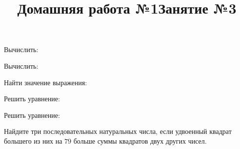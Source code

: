 \newpage
\title{Домашняя работа №1}
\begin{listofex}
	\item Вычислить:
	\begin{enumcols}[itemcolumns=1]
		\item {}
		\item {}
		\item {}
		\item {}
		\item {}
	\end{enumcols}
	\item Вычислить:
	\begin{enumcols}[itemcolumns=2]
		\item {}
		\item {}
		\item {}
		\item {}
	\end{enumcols}
	\item Найти значение выражения:
	\begin{enumcols}[itemcolumns=1]
		\item {}
		\item {}
	\end{enumcols}
	\item Решить уравнение:
	\begin{enumcols}[itemcolumns=2]
		\item {}
		\item {}
		\item {}
		\item {}
		\item {}
	\end{enumcols}
	\item Решить уравнение:
	\begin{enumcols}[itemcolumns=2]
		\item {}
		\item {}
	\end{enumcols}
	\item Найдите три последовательных натуральных числа, если удвоенный квадрат большего из них на \( 79 \) больше суммы квадратов двух других чисел.
\end{listofex}
\newpage
\title{Занятие №3}
